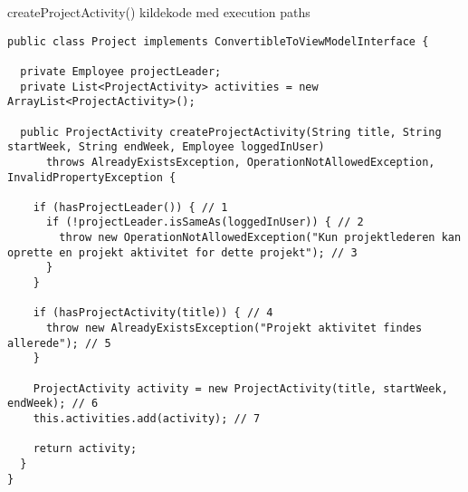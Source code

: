 \begin{listing}[H]
    \centering
    \caption{createProjectActivity() kildekode med execution paths}\label{lst:create_project_activity_source}
    \begin{verbatim}
public class Project implements ConvertibleToViewModelInterface {

  private Employee projectLeader;
  private List<ProjectActivity> activities = new ArrayList<ProjectActivity>();

  public ProjectActivity createProjectActivity(String title, String startWeek, String endWeek, Employee loggedInUser)
      throws AlreadyExistsException, OperationNotAllowedException, InvalidPropertyException {
        
    if (hasProjectLeader()) { // 1
      if (!projectLeader.isSameAs(loggedInUser)) { // 2
        throw new OperationNotAllowedException("Kun projektlederen kan oprette en projekt aktivitet for dette projekt"); // 3
      }
    }
    
    if (hasProjectActivity(title)) { // 4
      throw new AlreadyExistsException("Projekt aktivitet findes allerede"); // 5
    }
    
    ProjectActivity activity = new ProjectActivity(title, startWeek, endWeek); // 6
    this.activities.add(activity); // 7

    return activity;
  } 
}
    \end{verbatim}
\end{listing}
